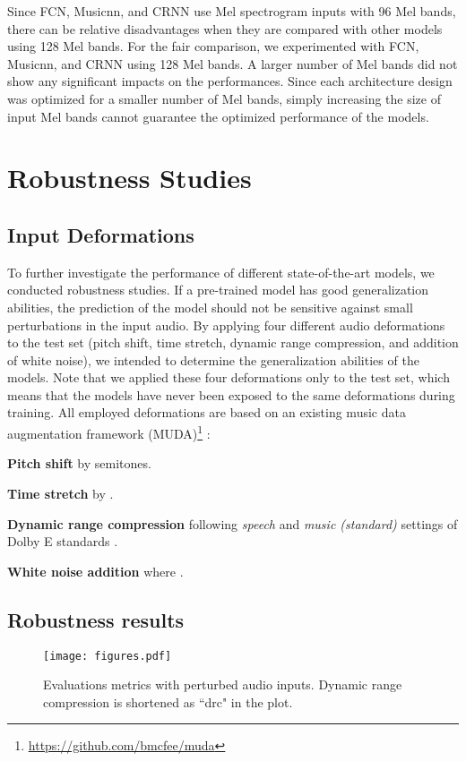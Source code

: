 \documentclass{article}
\begin{document}
Since FCN, Musicnn, and CRNN use Mel spectrogram inputs with 96 Mel bands, there can be relative disadvantages when they are compared with other models using 128 Mel bands. For the fair comparison, we experimented with FCN, Musicnn, and CRNN using 128 Mel bands. A larger number of Mel bands did not show any significant impacts on the performances. Since each architecture design was optimized for a smaller number of Mel bands, simply increasing the size of input Mel bands cannot guarantee the optimized performance of the models.




%
 \section{Robustness Studies}\label{sec:robustness}
\subsection{Input Deformations}
To further investigate the performance of different state-of-the-art models, we conducted robustness studies. If a pre-trained model has good generalization abilities, the prediction of the model should not be sensitive against small perturbations in the input audio. By applying four different audio deformations to the test set (pitch shift, time stretch, dynamic range compression, and addition of white noise), we intended to determine the generalization abilities of the models. Note that we applied these four deformations only to the test set, which means that the models have never been exposed to the same deformations during training. All employed deformations are based on an existing music data augmentation framework (MUDA)\footnote{\url{https://github.com/bmcfee/muda}} \cite{mcfee2015software}:

\noindent\textbf{Pitch shift} by  semitones.

\noindent\textbf{Time stretch} by .

\noindent\textbf{Dynamic range compression} following \textit{speech} and \textit{music (standard)} settings of Dolby E standards \cite{dolby2002standards}.

\noindent\textbf{White noise addition}  where .





\subsection{Robustness results}
\begin{figure*}[t!]
    \centering
    \texttt{[image: figures.pdf]} 
    \caption{Evaluations metrics with perturbed audio inputs. Dynamic range compression is shortened as ``drc" in the plot.}
    \label{fig:robustness}
\end{figure*}
\end{document}
